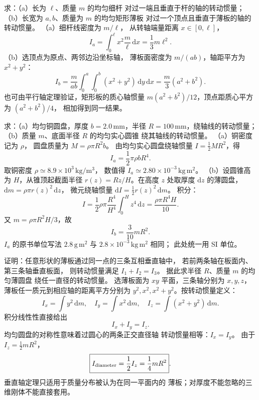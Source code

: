 求：（a）长为 $\ell$、质量 $m$ 的均匀细杆
对过一端且垂直于杆的轴的转动惯量；
（b）长宽为 $a,b$、质量为 $m$ 的均匀矩形薄板
对过一个顶点且垂直于薄板的轴的转动惯量。
\exsolution
（a）细杆线密度为 $m/\ell$，
从转轴端量距离 $x\in[0,\ell]$，
\[
I_a=\int_0^\ell x^2\frac m\ell\,\mathrm dx
=\boxed{\frac13m\ell^2}.
\]
（b）选顶点为原点、两邻边沿坐标轴，
薄板面密度为 $m/(ab)$，轴距平方为 $x^2+y^2$：
\[
I_b=\frac{m}{ab}\int_0^a\int_0^b
(x^2+y^2)\,\mathrm dy\,\mathrm dx
=\boxed{\frac m3(a^2+b^2)}.
\]
\excheck 也可由平行轴定理验证，矩形板的质心轴惯量
$m(a^2+b^2)/12$，顶点距质心平方为 $(a^2+b^2)/4$，
相加得到同一结果。

求：（a）均匀铜圆盘，厚度
$b=2.0\,\mathrm{mm}$，半径
$R=100\,\mathrm{mm}$，绕轴线的转动惯量；
（b）质量 $m$、底面半径 $R$ 的均匀实心圆锥
绕其轴线的转动惯量。
\exsolution
（a）铜密度记为 $\rho$，
圆盘质量为 $M=\rho\pi R^2b$。
由均匀实心圆盘绕轴惯量
$I=\tfrac12MR^2$，得
\[
\boxed{I_a=\frac12\pi\rho bR^4}.
\]
取铜密度 $\rho\simeq8.9\times10^3\,\mathrm{kg/m^3}$，
数值得
$\boxed{I_a\simeq2.80\times10^{-3}\,\mathrm{kg\,m^2}}$。
（b）设圆锥高为 $H$，从锥顶起截面半径
$r(z)=Rz/H$。在高度 $z$ 处取厚度
$\mathrm dz$ 的薄圆盘，
$\mathrm dm=\rho\pi r(z)^2\,\mathrm dz$，
微元绕轴惯量 $\mathrm dI=\tfrac12r(z)^2\,\mathrm dm$。
积分：
\[
I=\frac12\rho\pi\frac{R^4}{H^4}
\int_0^H z^4\,\mathrm dz
=\frac{\rho\pi R^4H}{10}.
\]
又 $m=\rho\pi R^2H/3$，故
\[
\boxed{I_b=\frac{3}{10}mR^2}.
\]
\excheck $I_a$ 的原书单位写法 $2.8\,\mathrm{g\,m^2}$
与 $2.8\times10^{-3}\,\mathrm{kg\,m^2}$ 相同；
此处统一用 SI 单位。

证明：任意形状的薄板通过同一点的三条互相垂直轴中，
若前两条轴在板面内、第三条轴垂直板面，
则转动惯量满足 $I_1+I_2=I_3$。
据此求半径 $R$、质量 $m$ 的均匀薄圆盘
绕任一直径的转动惯量。
\exsolution
选薄板面为 $xy$ 平面，三条轴分别为 $x,y,z$，
薄板任一质元到相应轴的距离平方分别为
$y^2,x^2,x^2+y^2$。按转动惯量定义：
\[
I_x=\int y^2\,\mathrm dm,\quad
I_y=\int x^2\,\mathrm dm,\quad
I_z=\int(x^2+y^2)\,\mathrm dm.
\]
积分线性性直接给出
\[
\boxed{I_x+I_y=I_z}.
\]
均匀圆盘的对称性意味着过圆心的两条正交直径轴
转动惯量相等：$I_x=I_y$。
由于 $I_z=\tfrac12mR^2$，
\[
\boxed{I_{\rm diameter}=\frac12I_z=\frac14mR^2}.
\]
\excheck 垂直轴定理只适用于质量分布被认为在同一平面内的
薄板；对厚度不能忽略的三维刚体不能直接套用。
